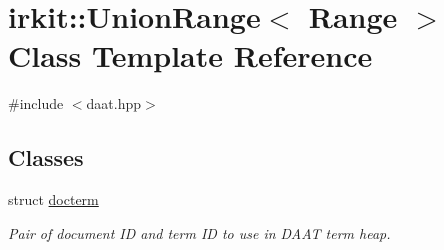 \hypertarget{classirkit_1_1UnionRange}{}\section{irkit\+:\+:Union\+Range$<$ Range $>$ Class Template Reference}
\label{classirkit_1_1UnionRange}


{\ttfamily \#include $<$daat.\+hpp$>$}

\subsection*{Classes}
\begin{DoxyCompactItemize}
\item 
struct \hyperlink{structirkit_1_1UnionRange_1_1docterm}{docterm}
\begin{DoxyCompactList}\small\item\em Pair of document ID and term ID to use in D\+A\+AT term heap. \end{DoxyCompactList}\end{DoxyCompactItemize}
